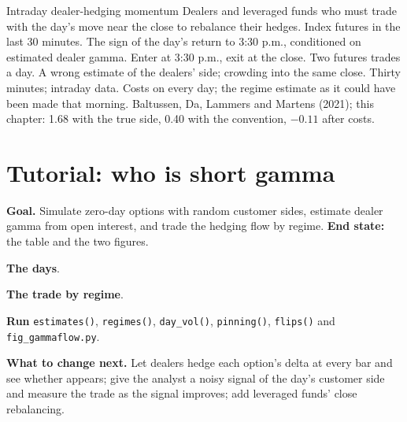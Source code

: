\begin{strategyfile}{Intraday dealer-hedging momentum}\label{strat:s2:zero-day-options-and-dealer-gamma-flows:momentum}
 Dealers and leveraged funds who must trade with the day's move near the close to rebalance their hedges.
 Index futures in the last 30 minutes.
 The sign of the day's return to 3:30 p.m., conditioned on estimated dealer gamma.
 Enter at 3:30 p.m., exit at the close.
 Two futures trades a day.
 A wrong estimate of the dealers' side; crowding into the same close.
 Thirty minutes; intraday data.
 Costs on every day; the regime estimate as it could have been made that morning.
 Baltussen, Da, Lammers and Martens (2021); this chapter: 1.68 with the true side, 0.40 with the convention, $-0.11$ after costs.
\end{strategyfile}

\section{Tutorial: who is short gamma}\label{tut:s2:zero-day-options-and-dealer-gamma-flows:tut}

\begin{tutorial}
\textbf{Goal.} Simulate zero-day options with random customer sides, estimate dealer gamma from open interest, and trade the hedging flow by
regime. \textbf{End state:} the table and the two figures.
\begin{tutsteps}
\item \textbf{The days}.
\label{lst:s2:zero-day-options-and-dealer-gamma-flows:days}
\item \textbf{The trade by regime}.
\label{lst:s2:zero-day-options-and-dealer-gamma-flows:trade}
\item \textbf{Run} \texttt{estimates()}, \texttt{regimes()}, \texttt{day\_vol()}, \texttt{pinning()}, \texttt{flips()} and
\texttt{fig\_gammaflow.py}.
\end{tutsteps}
\textbf{What to change next.} Let dealers hedge each option's delta at every bar and see whether  appears; give the analyst a noisy
signal of the day's customer side and measure the trade as the signal improves; add leveraged funds' close rebalancing.
\end{tutorial}


